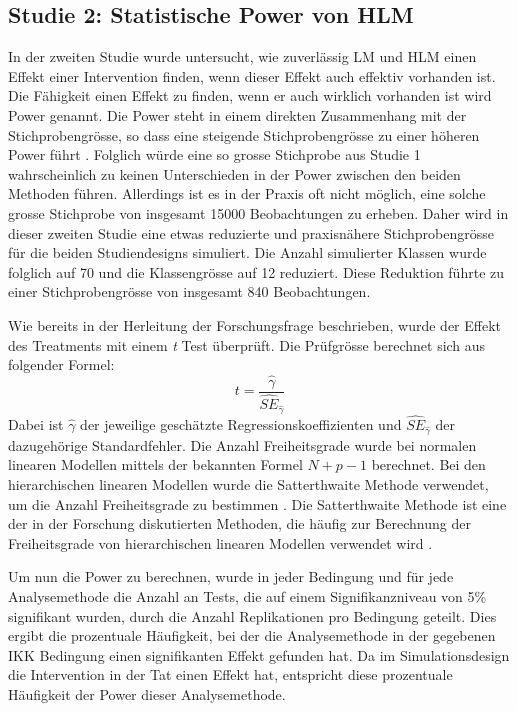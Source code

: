 \documentclass[12pt]{article}\usepackage[]{graphicx}\usepackage[]{color}
\begin{document}
\subsection{Studie 2: Statistische Power von HLM}
In der zweiten Studie wurde untersucht, wie zuverlässig LM und HLM einen Effekt einer Intervention finden, wenn dieser Effekt auch effektiv vorhanden ist. Die Fähigkeit einen Effekt zu finden, wenn er auch wirklich vorhanden ist wird Power genannt. Die Power steht in einem direkten Zusammenhang mit der Stichprobengrösse, so dass eine steigende Stichprobengrösse zu einer höheren Power führt \citep{snijders2005samplesizepower}. Folglich würde eine so grosse Stichprobe aus Studie 1 wahrscheinlich zu keinen Unterschieden in der Power zwischen den beiden Methoden führen. Allerdings ist es in der Praxis oft nicht möglich, eine solche grosse Stichprobe von insgesamt 15000 Beobachtungen zu erheben. Daher wird in dieser zweiten Studie eine etwas reduzierte und praxisnähere Stichprobengrösse für die beiden Studiendesigns simuliert. Die Anzahl simulierter Klassen wurde folglich auf 70 und die Klassengrösse auf 12 reduziert. Diese Reduktion führte zu einer Stichprobengrösse von insgesamt 840 Beobachtungen. 

Wie bereits in der Herleitung der Forschungsfrage beschrieben, wurde der Effekt des Treatments mit einem \textit{t} Test überprüft. Die Prüfgrösse berechnet sich aus folgender Formel:
\begin{equation}
t = \dfrac{\widehat{\gamma}}{\widehat{SE}_{\widehat{\gamma}}}
\end{equation}
Dabei ist $\widehat{\gamma}$ der jeweilige geschätzte Regressionskoeffizienten und $\widehat{SE}_{\widehat{\gamma}}$ der dazugehörige Standardfehler. Die Anzahl Freiheitsgrade wurde bei normalen linearen Modellen mittels der bekannten Formel $N + p - 1$ berechnet. Bei den hierarchischen linearen Modellen wurde die Satterthwaite Methode verwendet, um die Anzahl Freiheitsgrade zu bestimmen \citeyearpar{satter1941synthesis}. Die Satterthwaite Methode ist eine der in der Forschung diskutierten Methoden, die häufig zur Berechnung der Freiheitsgrade von hierarchischen linearen Modellen verwendet wird \citep{raudenbush2002hierarchical,SnijdersTomA.B2012Ma:a}. 

Um nun die Power zu berechnen, wurde in jeder Bedingung und für jede Analysemethode die Anzahl an Tests, die auf einem Signifikanzniveau von 5\% signifikant wurden, durch die Anzahl Replikationen pro Bedingung geteilt. Dies ergibt die prozentuale Häufigkeit, bei der die Analysemethode in der gegebenen IKK Bedingung einen signifikanten Effekt gefunden hat. Da im Simulationsdesign die Intervention in der Tat einen Effekt hat, entspricht diese prozentuale Häufigkeit der Power dieser Analysemethode.
\end{document}

